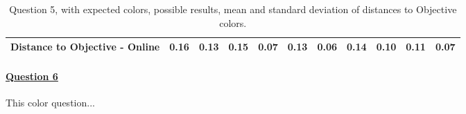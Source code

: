\begin{table}[H]
{\begin{tabular}{lccccccccccccc}
    \multicolumn{4}{l}{Distance to Objective - Online}                                                                                               & \multicolumn{1}{|c}{0.16}        & \multicolumn{1}{c|}{0.13}    & \multicolumn{1}{|c}{0.15}        & \multicolumn{1}{c|}{0.07}    & \multicolumn{1}{|c}{\textbf{0.13}}       & \multicolumn{1}{c|}{0.06}    & \multicolumn{1}{|c}{0.14}        & \multicolumn{1}{c|}{0.10}    & \multicolumn{1}{|c}{0.11}       & \multicolumn{1}{c|}{0.07}    \\ \hline
    \end{tabular}}
  \caption[Question 5, with expected Results.]{Question 5, with expected colors, possible results, mean and standard deviation of distances to Objective colors.}
  \label{table:lab_q5_expected}
\end{table}
%
\paragraph{\ul{Question 6}}
%
This color question...
%
